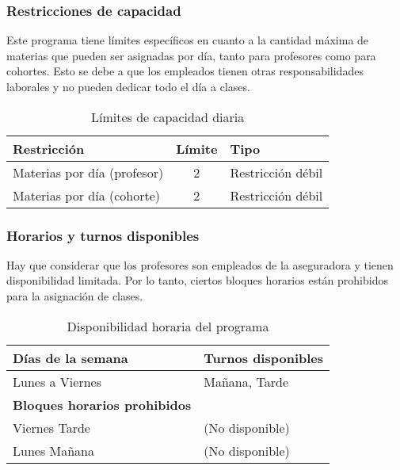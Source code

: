 \subsubsection{Restricciones de capacidad}
Este programa tiene límites específicos en cuanto a la cantidad máxima de materias que pueden ser asignadas por día, tanto para profesores como para cohortes. Esto se debe a que los empleados tienen otras responsabilidades laborales y no pueden dedicar todo el día a clases.
\begin{table}[ht]
\centering
\begin{tabular}{|l|c|l|}
\hline
\textbf{Restricción} & \textbf{Límite} & \textbf{Tipo} \\
\hline
Materias por día (profesor) & 2 & Restricción débil \\
Materias por día (cohorte) & 2 & Restricción débil \\
\hline
\end{tabular}
\caption{Límites de capacidad diaria}
\end{table}

\subsubsection{Horarios y turnos disponibles}
Hay que considerar que los profesores son empleados de la aseguradora y tienen disponibilidad limitada. Por lo tanto, ciertos bloques horarios están prohibidos para la asignación de clases.
\begin{table}[ht]
\centering
\begin{tabular}{|l|l|}
\hline
\textbf{Días de la semana} & \textbf{Turnos disponibles} \\
\hline
Lunes a Viernes & Mañana, Tarde \\
\hline
\textbf{Bloques horarios prohibidos} & \\
\hline
Viernes Tarde & (No disponible) \\
Lunes Mañana & (No disponible) \\
\hline
\end{tabular}
\caption{Disponibilidad horaria del programa}
\end{table}

\newpage
